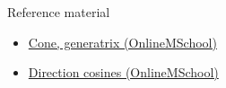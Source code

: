 \documentclass[aspectratio=169]{beamer}
\newcommand{\fbckg}[1]{\usebackgroundtemplate{\texttt{[image: \#1]}}}%
\begin{document}
\begin{frame}[t]{Reference material}
    \Large
    \begin{itemize}
        \item \href{https://onlinemschool.com/math/formula/cone/}{Cone, generatrix (OnlineMSchool)}
        \item \href{https://onlinemschool.com/math/library/vector/cos/}{Direction cosines (OnlineMSchool)}
    \end{itemize}
\end{frame}

\fbckg{fibeamer/figs/last_page.png}
\frame[plain]{}
\end{document}
